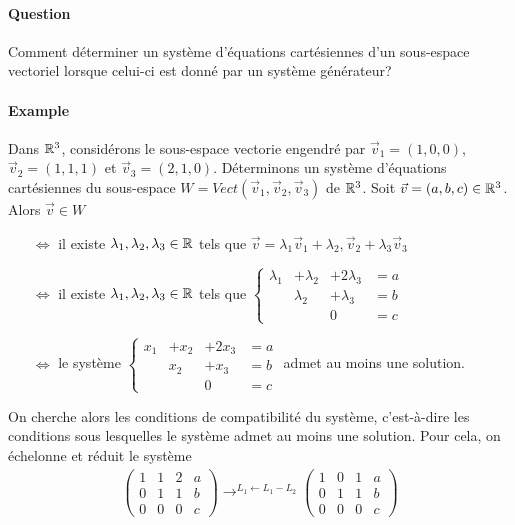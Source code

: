 \paragraph{Question} Comment déterminer un système d'équations cartésiennes d'un sous-espace vectoriel lorsque celui-ci est donné par un système générateur?

\paragraph{Example} Dans $\mathbb{R}^3$, considérons le sous-espace vectorie engendré par $\vec{v}_1 = (1, 0, 0)$, $\vec{v}_2 = (1, 1, 1)$ et $\vec{v}_3 = (2, 1, 0)$. Déterminons un système d'équations cartésiennes du sous-espace $W = Vect(\vec{v}_1, \vec{v}_2, \vec{v}_3)$ de $\mathbb{R}^3$. Soit $\vec{v} = (a, b, c) \in \mathbb{R}^3$. \\
Alors $\vec{v} \in W$ 
\begin{itemize}
  \item[$\Leftrightarrow$] il existe $\lambda_1, \lambda_2, \lambda_3 \in \mathbb{R}$ tels que $\vec{v} = \lambda_1 \vec{v}_1 + \lambda_2, \vec{v}_2 + \lambda_3 \vec{v}_3$ 
  \item[$\Leftrightarrow$] il existe $\lambda_1, \lambda_2, \lambda_3 \in \mathbb{R}$ tels que 
    $\left\{ \begin{array}{rrrc}
       \lambda_1 & + \lambda_2 & + 2 \lambda_3 & = a \\
       & \lambda_2 & + \lambda_3 & = b \\
       &  & 0 & = c
    \end{array}$
  \item [$\Leftrightarrow$] le système 
    $\left\{ \begin{array}{rrrc}
      x_1 & + x_2 & + 2 x_3 & = a \\
       & x_2 & + x_3 & = b \\
       &  & 0 & = c
    \end{array}$ admet au moins une solution.
\end{itemize}
On cherche alors les conditions de compatibilité du système, c'est-à-dire les conditions sous lesquelles le système admet au moins une solution. Pour cela, on échelonne et réduit le système
\begin{eqnarray*}
  \begin{pmatrix}
    1 & 1 & 2 & a \\
    0 & 1 & 1 & b \\
    0 & 0 & 0 & c
  \end{pmatrix}
  \rightarrow^{L_1 \leftarrow L_1 - L_2} 
  \begin{pmatrix}
    1 & 0 & 1 & a \\
    0 & 1 & 1 & b \\
    0 & 0 & 0 & c
  \end{pmatrix}
\end{eqnarray*}
